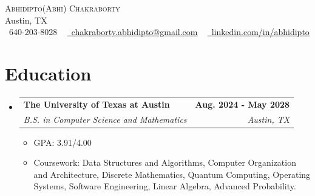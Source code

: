 \documentclass[letterpaper,10.5pt]{article}
\makeatletter
\newcommand{\resumeItem}[1]{
  \item\small{
    {#1 \vspace{-2pt}}
  }
}
\newcommand{\resumeSubheading}[4]{
  \vspace{-3pt}\item
    \begin{tabular*}{1.0\textwidth}[t]{l@{\extracolsep{\fill}}r}
      \textbf{#1} & \textbf{\small #2} \\
      \textit{\small#3} & \textit{\small #4} \\
    \end{tabular*}\vspace{-7pt}
}
\newcommand{\resumeSubHeadingListStart}{\begin{itemize}[leftmargin=0.0in, label={}, topsep=0pt, itemsep=0pt, parsep=0pt]}
\newcommand{\resumeSubHeadingListEnd}{\end{itemize}}
\newcommand{\resumeItemListStart}{\begin{itemize}[topsep=-1pt, itemsep=-2pt, parsep=0pt, partopsep=0pt]}
\newcommand{\resumeItemListEnd}{\end{itemize}\vspace{-5pt}}
\makeatother
\begin{document}
\begin{center}
    {\Huge \scshape Abhidipto(Abhi) Chakraborty} \\ \vspace{1pt}
    Austin, TX \\ \vspace{1pt}
    \small
    \raisebox{-0.1\height}\faPhone\ 640-203-8028 ~
    \href{mailto:chakraborty.abhidipto@gmail.com}{\raisebox{-0.2\height}\faEnvelope\ \underline{chakraborty.abhidipto@gmail.com}} ~
    \href{https://www.linkedin.com/in/abhidipto}{\raisebox{-0.2\height}\faLinkedin\ \underline{linkedin.com/in/abhidipto}}
    \vspace{-10pt}
\end{center}

\section{Education}
\resumeSubHeadingListStart
\resumeSubheading{The University of Texas at Austin}{Aug. 2024 - May 2028}{B.S. in Computer Science and Mathematics}{Austin, TX}
\resumeItemListStart
\resumeItem{GPA: 3.91/4.00}
\resumeItem{Coursework: Data Structures and Algorithms, Computer Organization and Architecture, Discrete Mathematics, Quantum Computing, Operating Systems, Software Engineering, Linear Algebra, Advanced Probability.}
\resumeItemListEnd
\resumeSubHeadingListEnd

\end{document}
